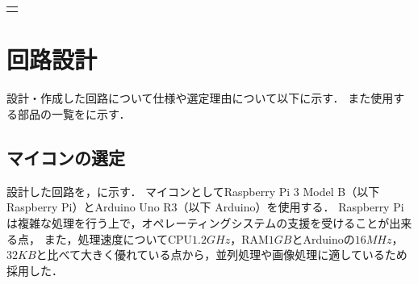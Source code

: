 \documentclass[11pt,a4]{jsarticle}
\begin{document}

    \begin{tabular}{c}
      \begin{minipage}{0.45\hsize}
        {H}{1.0}{picture/arm_left.eps}{アーム左面}
      \end{minipage}
      \begin{minipage}{0.45\hsize}
        {H}{1.0}{picture/arm_right.eps}{アーム左面}
      \end{minipage}
    \end{tabular}


\section{回路設計}  %

  設計・作成した回路について仕様や選定理由について以下に示す．
  また使用する部品の一覧をに示す．

  \subsection{マイコンの選定}
    設計した回路を，に示す．
    マイコンとしてRaspberry Pi 3 Model B（以下 Raspberry Pi）とArduino Uno R3（以下 Arduino）を使用する．
    Raspberry Piは複雑な処理を行う上で，オペレーティングシステムの支援を受けることが出来る点，
    また，処理速度についてCPU$1.2\unit{GHz}$，RAM$1\unit{GB}$とArduinoの$16\unit{MHz}$，$32\unit{KB}$と比べて大きく優れている点から，並列処理や画像処理に適しているため採用した．
\end{document}
